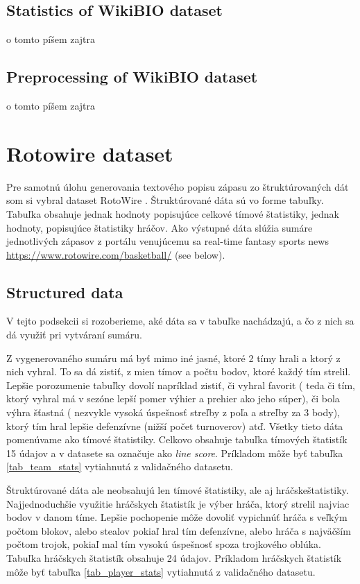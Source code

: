 \subsection{Statistics of WikiBIO dataset}
o tomto píšem zajtra

\subsection {Preprocessing of WikiBIO dataset}
o tomto píšem zajtra


\section{Rotowire dataset}

Pre samotnú úlohu generovania textového popisu zápasu zo štruktúrovaných dát som si vybral dataset RotoWire \citep{wiseman2017}. Štruktúrované dáta sú vo forme tabuľky. Tabuľka obsahuje jednak hodnoty popisujúce celkové tímové štatistiky, jednak hodnoty, popisujúce štatistiky hráčov. Ako výstupné dáta slúžia sumáre jednotlivých zápasov z portálu venujúcemu sa real-time fantasy sports news \url{https://www.rotowire.com/basketball/} (see below).

\subsection{Structured data}

V tejto podsekcii si rozoberieme, aké dáta sa v tabuľke nachádzajú, a čo z nich sa dá využiť pri vytváraní sumáru.

Z vygenerovaného sumáru má byť mimo iné jasné, ktoré 2 tímy hrali a ktorý z nich vyhral. To sa dá zistiť, z mien tímov a počtu bodov, ktoré každý tím strelil. Lepšie porozumenie tabuľky dovolí napríklad zistiť, či vyhral favorit ( teda či tím, ktorý vyhral má v sezóne lepší pomer výhier a prehier ako jeho súper), či bola výhra šťastná ( nezvykle vysoká úspešnosť streľby z poľa a streľby za 3 body), ktorý tím hral lepšie defenzívne (nižší počet turnoverov) atď. Všetky tieto dáta pomenúvame ako tímové štatistiky. Celkovo obsahuje tabuľka tímových štatistík 15 údajov a v datasete sa označuje ako \emph{line score}. Príkladom môže byť tabuľka \ref{tab_team_stats} vytiahnutá z validačného datasetu.

Štruktúrované dáta ale neobsahujú len tímové štatistiky, ale aj hráčske\linebreak[4]štatistiky. Najjednoduchšie využitie hráčskych štatistík je výber hráča, ktorý strelil najviac bodov v danom tíme. Lepšie pochopenie môže dovoliť vypichnúť hráča s veľkým počtom blokov, alebo stealov pokiaľ hral tím defenzívne, alebo hráča s najväčším počtom trojok, pokiaľ mal tím vysokú úspešnosť spoza trojkového oblúka. Tabuľka hráčskych štatistík obsahuje 24 údajov. Príkladom hráčskych štatistík môže byť tabuľka \ref{tab_player_stats} vytiahnutá z validačného datasetu.


